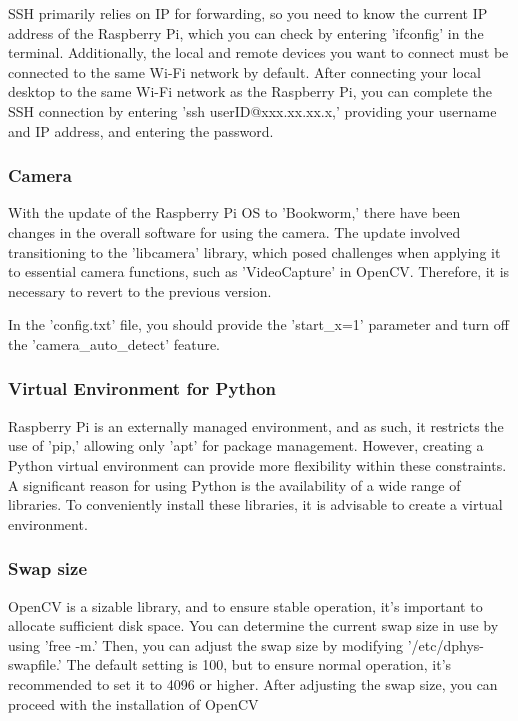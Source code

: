SSH primarily relies on IP for forwarding, so you need to know the current IP address of the Raspberry Pi, which you can check by entering 'ifconfig' in the terminal. Additionally, the local and remote devices you want to connect must be connected to the same Wi-Fi network by default.
After connecting your local desktop to the same Wi-Fi network as the Raspberry Pi, you can complete the SSH connection by entering 'ssh userID@xxx.xx.xx.x,' providing your username and IP address, and entering the password.\\

\subsubsection{\textbf{Camera}}
With the update of the Raspberry Pi OS to 'Bookworm,' there have been changes in the overall software for using the camera. The update involved transitioning to the 'libcamera' library, which posed challenges when applying it to essential camera functions, such as 'VideoCapture' in OpenCV. Therefore, it is necessary to revert to the previous version.

In the 'config.txt' file, you should provide the 'start\_x=1' parameter and turn off the 'camera\_auto\_detect' feature.\\

\subsubsection{\textbf{Virtual Environment for Python}}
Raspberry Pi is an externally managed environment, and as such, it restricts the use of 'pip,' allowing only 'apt' for package management. However, creating a Python virtual environment can provide more flexibility within these constraints. A significant reason for using Python is the availability of a wide range of libraries. To conveniently install these libraries, it is advisable to create a virtual environment.\\

\subsubsection{\textbf{Swap size}}
OpenCV is a sizable library, and to ensure stable operation, it's important to allocate sufficient disk space. You can determine the current swap size in use by using 'free -m.' Then, you can adjust the swap size by modifying '/etc/dphys-swapfile.' The default setting is 100, but to ensure normal operation, it's recommended to set it to 4096 or higher. After adjusting the swap size, you can proceed with the installation of OpenCV\\

